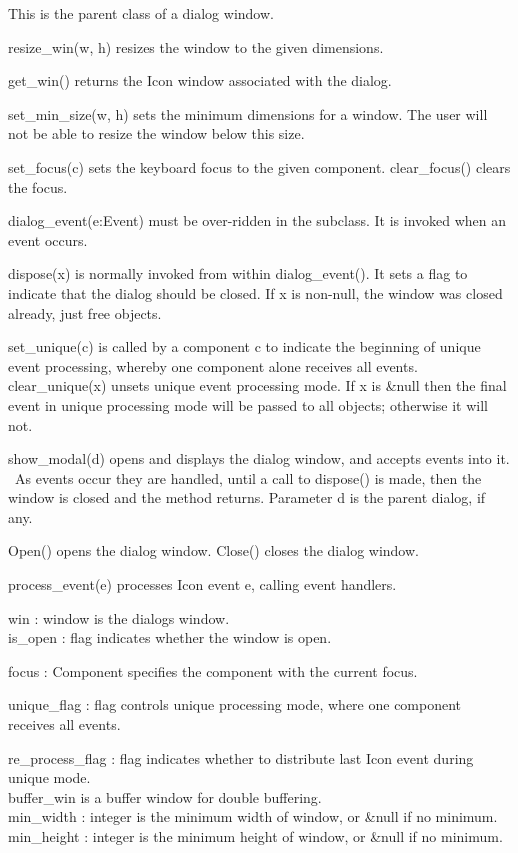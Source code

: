 This is the parent class of a dialog window.

resize\_win(w, h) resizes the window to the given dimensions.

get\_win() returns the Icon window associated with the dialog.

set\_min\_size(w, h) sets the minimum dimensions for a window. The user
will not be able to resize the window below this size.

set\_focus(c) sets the keyboard focus to the given component.
clear\_focus() clears the focus.

dialog\_event(e:Event) must be over-ridden in the subclass. It is
invoked when an event occurs.

dispose(x) is normally invoked from within dialog\_event(). It sets a
flag to indicate that the dialog should be closed. If x is non-null,
the window was closed already, just free objects.

set\_unique(c) is called by a component c to indicate the beginning of
unique event processing, whereby one component alone receives all
events.\\
clear\_unique(x) unsets unique event processing mode. If x is \&null
then the final event in unique processing mode will be passed to all
objects; otherwise it will not.

show\_modal(d) opens and displays the dialog window, and accepts events
into it. \ As events occur they are handled, until a call to dispose()
is made, then the window is closed and the method returns. Parameter d
is the parent dialog, if any.

Open() opens the dialog window. Close() closes the dialog window.

process\_event(e) processes Icon event e, calling event handlers.

win : window is the dialog{\textquotesingle}s window.\\
is\_open : flag indicates whether the window is open.

focus : Component specifies the component with the current focus.

unique\_flag : flag controls unique processing mode, where one component
receives all events.

re\_process\_flag : flag indicates whether to distribute last Icon event
during unique mode.\\
buffer\_win is a buffer window for double buffering.\\
min\_width : integer is the minimum width of window, or \&null if no
minimum.\\
min\_height : integer is the minimum height of window, or \&null if no
minimum.

